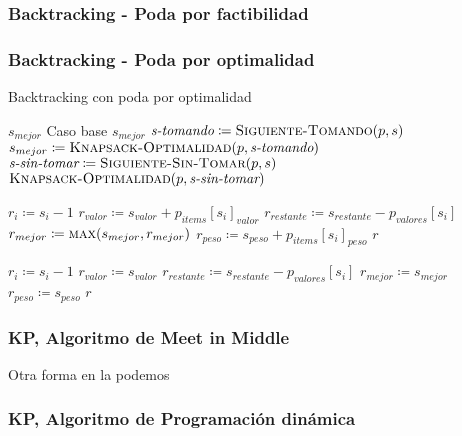 \documentclass[fleqn, 11pt]{article}
\def\is{\coloneqq}
\begin{document}
\subsubsection{Backtracking - Poda por factibilidad}
\subsubsection{Backtracking - Poda por optimalidad}

\begin{algorithm}
\caption{Backtracking con poda por optimalidad}
\begin{algorithmic}[1]
	\State \Return $s_{mejor}$
	\Comment Caso base
\EndIf
{}
	\State \Return $s_{mejor}$
\EndIf
{}
	\State $\textit{s-tomando} \is \Call{Siguiente-Tomando}{p, s}$
	\State $s_{mejor} \is \Call{Knapsack-Optimalidad}{p, \textit{s-tomando}}$
\EndIf
\State $\textit{s-sin-tomar} \is \Call{Siguiente-Sin-Tomar}{p, s}$
\State \Return $\Call{Knapsack-Optimalidad}{p, \textit{s-sin-tomar}}$

\EndFunction
\end{algorithmic}
\begin{algorithmic}[1]
\State $r_i \is s_i - 1$
\State $r_{valor} \is s_{valor} + p_{items}[s_i]_{valor}$
\State $r_{restante} \is s_{restante} - p_{valores}[s_i]$
\State $r_{mejor} \is \Call{max}{s_{mejor}, r_{mejor}}$
\State $r_{peso} \is s_{peso} + p_{items}[s_i]_{peso}$
\State \Return $r$
\EndFunction
\end{algorithmic}
\begin{algorithmic}[1]
\State $r_i \is s_i - 1$
\State $r_{valor} \is s_{valor}$
\State $r_{restante} \is s_{restante} - p_{valores}[s_i]$
\State $r_{mejor} \is s_{mejor}$
\State $r_{peso} \is s_{peso}$
\State \Return $r$
\EndFunction
\end{algorithmic}
\end{algorithm}
\clearpage

\subsubsection{\textbf{KP, Algoritmo de Meet in Middle}}

Otra forma en la podemos

\clearpage


\subsubsection{\textbf{KP, Algoritmo de Programación dinámica}}
\end{document}
